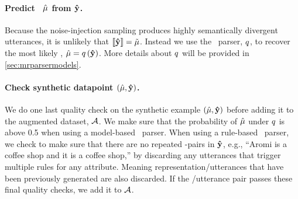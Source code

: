 \paragraph{{Predict \meaningrepresentation~$\hat{\mu}$ from
$\boldsymbol{\hat{\mathbf{y}}}$.}} 
Because the noise-injection sampling produces highly
semantically divergent utterances, it is unlikely that $\left\llbracket \boldsymbol{\hat{\mathbf{y}}}  \right\rrbracket
= \tilde{\mu}$. Instead we use the \meaningrepresentation~parser, $q$, to
recover the most likely \meaningrepresentation, $\hat{\mu} =
q\left(\boldsymbol{\hat{\mathbf{y}}}\right)$.  More details about $q$ will be
provided in \autoref{sec:mrparsermodels}.

\paragraph{{Check synthetic datapoint $(\hat{\mu},\boldsymbol{\hat{\mathbf{y}}})$.}}
We do one last quality check on the synthetic example
$(\hat{\mu},\boldsymbol{\hat{\mathbf{y}}})$ before adding it to the augmented dataset,
${\mathcal{A}}$. We make sure that the probability of $\hat{\mu}$ under $q$
is above 0.5 when using a model-based \meaningrepresentation~parser. When using
a rule-based \meaningrepresentation~parser, we check to make sure that there
are no repeated \attributevalue-pairs in $\boldsymbol{\hat{\mathbf{y}}}$, e.g., ``Aromi is a
coffee shop and it is a coffee shop,'' by discarding any utterances that
trigger multiple rules for any attribute.  Meaning representation/utterances
that have been previously generated are also discarded. If the
\meaningrepresentation/utterance pair passes these final quality checks, we add
it to ${\mathcal{A}}$.

